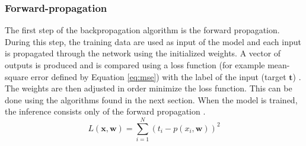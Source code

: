\subsubsection{Forward-propagation} \label{subs:trainforward}
%
The first step of the backpropagation algorithm is the forward propagation. During this step, the training data are used as input of the model and each input is propagated through the network using the initialized weights. A vector of outputs is produced and is compared using a loss function (for example mean-square error defined by Equation \eqref{eq:mse}) with the label of the input (target $\boldsymbol{t}$) \cite{matteucci_artificial_2019}. The weights are then adjusted in order minimize the loss function. This can be done using the algorithms found in the next section. When the model is trained, the inference consists only of the forward propagation \cite{abdelouahab_accelerating_2018}.
%
\begin{equation}
    L(\boldsymbol{x}, \boldsymbol{w}) = \sum^{N}_{i=1} (t_i - p(x_i, \boldsymbol{w}))^2
    \label{eq:mse}
\end{equation}
